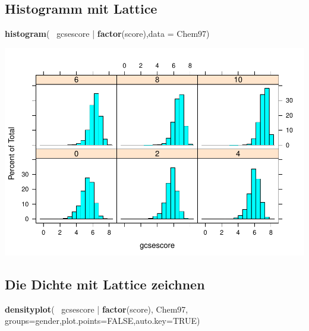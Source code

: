 \documentclass[]{article}
\newenvironment{Shaded}{\begin{snugshade}}{\end{snugshade}}
\newcommand{\KeywordTok}[1]{\textcolor[rgb]{0.13,0.29,0.53}{\textbf{{#1}}}}
\newcommand{\DataTypeTok}[1]{\textcolor[rgb]{0.13,0.29,0.53}{{#1}}}
\newcommand{\StringTok}[1]{\textcolor[rgb]{0.31,0.60,0.02}{{#1}}}
\newcommand{\OtherTok}[1]{\textcolor[rgb]{0.56,0.35,0.01}{{#1}}}
\newcommand{\NormalTok}[1]{{#1}}
\begin{document}
\subsection{Histogramm mit Lattice}\label{histogramm-mit-lattice-1}

\begin{Shaded}
\begin{Highlighting}[]
  \KeywordTok{histogram}\NormalTok{(~}\StringTok{ }\NormalTok{gcsescore |}\StringTok{ }\KeywordTok{factor}\NormalTok{(score),}\DataTypeTok{data =} \NormalTok{Chem97)}
\end{Highlighting}
\end{Shaded}

\includegraphics{Intro_Datenanalyse1_files/figure-latex/unnamed-chunk-172-1.pdf}

\subsection{Die Dichte mit Lattice
zeichnen}\label{die-dichte-mit-lattice-zeichnen}

\begin{Shaded}
\begin{Highlighting}[]
\KeywordTok{densityplot}\NormalTok{(~}\StringTok{ }\NormalTok{gcsescore |}\StringTok{ }\KeywordTok{factor}\NormalTok{(score), Chem97, }
    \DataTypeTok{groups=}\NormalTok{gender,}\DataTypeTok{plot.points=}\OtherTok{FALSE}\NormalTok{,}\DataTypeTok{auto.key=}\OtherTok{TRUE}\NormalTok{)}
\end{Highlighting}
\end{Shaded}
\end{document}
